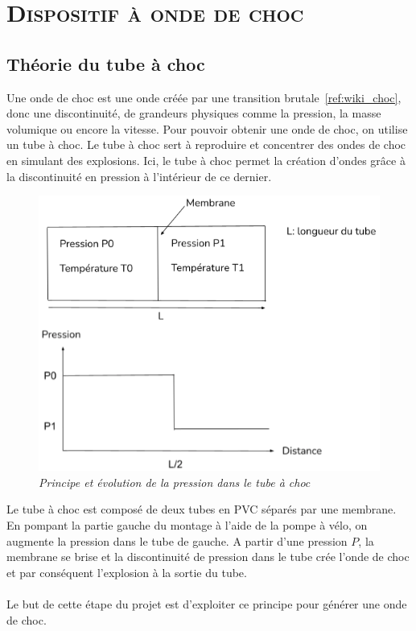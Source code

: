 \renewcommand{\chaptername}{\scshape Partie}
\chapter{\normalfont \scshape Dispositif à onde de choc}
\section{Théorie du tube à choc}
Une onde de choc est une onde créée par une transition brutale~\ref{ref:wiki_choc}, donc une discontinuité, de grandeurs physiques comme la pression, la masse volumique ou encore la vitesse.
Pour pouvoir obtenir une onde de choc, on utilise un tube à choc. Le tube à choc sert à  reproduire et concentrer des ondes de choc en simulant des explosions.
Ici, le tube à choc permet la création d’ondes grâce à la discontinuité en pression à l’intérieur de ce dernier.\\
\begin{figure}[H]
	\centering
	\includegraphics[scale = 0.4]{figures/principe_choc.png}
	\caption{\small{\textit{Principe et évolution de la pression dans le tube à choc}}}
	\label{fig:principe_choc}
\end{figure}
Le tube à choc est composé de deux tubes en PVC séparés par une membrane. En pompant la partie gauche du montage à l'aide de la pompe à vélo, on augmente la pression dans le tube de gauche. A partir d'une pression $P$, la membrane se brise et la discontinuité de pression dans le tube crée l'onde de choc et par conséquent l'explosion à la sortie du tube.\\\\
Le but de cette étape du projet est d'exploiter ce principe pour générer une onde de choc.
